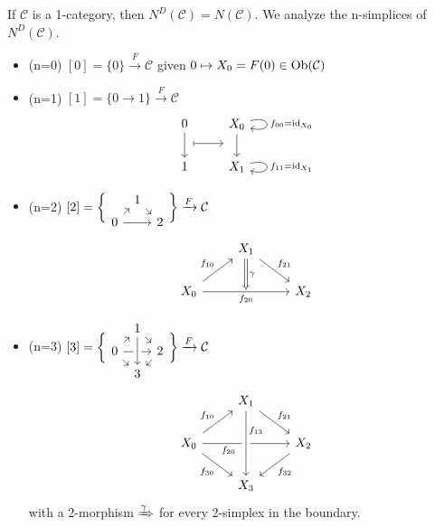 \begin{rmk}
\cite{kerodon}
	If $ \mathcal{C} $ is a 1-category, then $ N^D ( \mathcal{ C } ) = N ( \mathcal{ C } ) $.
	We analyze the n-simplices of $ N^D ( \mathcal{ C } ) $.
	\begin{itemize}
		\item 
		(n=0) $ [ 0 ] = \{ 0 \} \xrightarrow{ F } \mathcal{ C } $ given $ 0 \mapsto X_0 = F ( 0 ) \in \operatorname{Ob}( \mathcal{ C } ) $
		
		\item 
		(n=1)
		 $ [ 1 ] = \{ 0 \to 1 \} \xrightarrow{ F } \mathcal{ C } $
		 \[
		 \begin{tikzcd}
		 	0
		 	\ar[d] 
		 	\ar[r, mapsto, shift right=1.5em]
		 	&
		 	X_0
		 	\ar[d] 
		 	\ar[loop right, " f_{00} = \id_{X_0}"]
		 	\\
		 	1
		 	&
		 	X_1
		 	\ar[loop right, " f_{11} = \id_{ X_1 } " ]
		 \end{tikzcd}
		 \]
		 
		 \item 
		 (n=2)
		 $ [ 2 ] = 
		 \bigg\{
		 \begin{tikzcd}[column sep=1ex,row sep=1ex]
		 	&
		 	1
		 	\ar[rd]
		 	&
		 	\\
		 	0
		 	\ar[rr]
		 	\ar[ru] 
		 	&&
		 	2
		 \end{tikzcd}	
		 \bigg\}
		 \xrightarrow{F}
		 \mathcal{ C }
		 $
		 \[
		 \begin{tikzcd}	
		 	&
		 	X_1
		 	\ar[rd, "f_{21}"]
		 	\ar[d, Rightarrow, "\gamma"] 
		 	&
		 	\\
		 	X_0
		 	\ar[ru, "f_{10}" ]
		 	\ar[rr, "f_{20}"' ]
		 	&
		 	{}
		 	&
		 	X_2
		 \end{tikzcd}
		 \]
		 
		 \item 
		 (n=3)
		 $ [ 3 ] = 
		 \bigg\{
		 \begin{tikzcd}[column sep=1ex,row sep=1ex]
		 	&
		 	1
		 	\ar[rd]
		 	&
		 	\\
		 	0
		 	\ar[rd]
		 	\ar[rr]
		 	\ar[ru] 
		 	&&
		 	2
		 	\ar[ld]
		 	\\
		 	&
		 	3
		 	\arrow[from=uu, crossing over]
		 	&
		 \end{tikzcd}	
		 \bigg\}
		 \xrightarrow{F}
		 \mathcal{ C }
		 $
		 \[
		 \begin{tikzcd}	
		 	&
		 	X_1
		 	\ar[rd, "f_{21}"]
		 	&
		 	\\
		 	X_0
		 	\ar[rd, "f_{30}"']
		 	\ar[ru, "f_{10}" ]
		 	\ar[rr, "f_{20}"' pos=0.3 ]
		 	&
		 	{}
		 	&
		 	X_2
		 	\ar[ld, "f_{32}"]
		 	\\
		 	& 
		 	X_3
		 	\ar[from=uu, crossing over, "f_{13}" pos=0.3 ]
		 	&
		 \end{tikzcd}
		 \]
		 with a 2-morphism $ \xRightarrow{ \gamma } $ for every 2-simplex in the boundary.
		 

\end{itemize}
\end{rmk}
